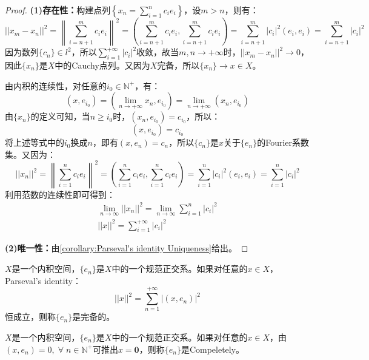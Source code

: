 \begin{proof}
	\textbf{(1)存在性：}构建点列$\left\{x_n=\sum\limits_{i=1}^{n}c_ie_i\right\}$，设$m>n$，则有：
	\begin{equation*}
		||x_m-x_n||^2=\left\|\sum_{i=n+1}^{m}c_ie_i\right\|^2=\left(\sum_{i=n+1}^{m}c_ie_i,\sum_{i=n+1}^{m}c_ie_i\right)=\sum_{i=n+1}^{m}|c_i|^2(e_i,e_i)=\sum_{i=n+1}^{m}|c_i|^2
	\end{equation*}
	因为数列$\{c_n\}\in l^2$，所以$\sum\limits_{i=1}^{+\infty}|c_i|^2$收敛，故当$m,n\to+\infty$时，$||x_m-x_n||^2\to0$，因此$\{x_n\}$是$X$中的Cauchy点列。又因为$X$完备，所以$\{x_n\}\to x\in X$。\par
	由内积的连续性，对任意的$i_0\in\mathbb{N}^+$，有：
	\begin{equation*}
		(x,e_{i_0})=\left(\lim_{n\to+\infty}x_n,e_{i_0}\right)=\lim_{n\to+\infty}(x_n,e_{i_0})
	\end{equation*}
	由$\{x_n\}$的定义可知，当$n\geqslant i_0$时，$(x_n,e_{i_0})=c_{i_0}$，所以：
	\begin{equation*}
		(x,e_{i_0})=c_{i_0}
	\end{equation*}
	将上述等式中的$i_0$换成$n$，即有$(x,e_n)=c_n$，所以$\{c_n\}$是$x$关于$\{e_n\}$的Fourier系数集。又因为：
	\begin{equation*}
		||x_n||^2=\left\|\sum_{i=1}^{n}c_ie_i\right\|^2=\left(\sum_{i=1}^{n}c_ie_i,\sum_{i=1}^{n}c_ie_i\right)=\sum_{i=1}^{n}|c_i|^2(e_i,e_i)=\sum_{i=1}^{n}|c_i|^2
	\end{equation*}
	利用范数的连续性即可得到：
	\begin{gather*}
		\lim_{n\to\infty}||x_n||^2=\lim_{n\to\infty}\sum_{i=1}^{n}|c_i|^2 \\
		||x||^2=\sum_{i=1}^{+\infty}|c_i|^2
	\end{gather*}\par
	\textbf{(2)唯一性：}由\cref{corollary:Parseval's identity Uniqueness}给出。
\end{proof}
\begin{definition}
	$X$是一个内积空间，$\{e_n\}$是$X$中的一个规范正交系。如果对任意的$x\in X$，Parseval's identity：
	\begin{equation*}
		||x||^2=\sum_{n=1}^{+\infty}|(x,e_n)|^2
	\end{equation*}
	恒成立，则称$\{e_n\}$是完备的。
\end{definition}
\begin{definition}
	$X$是一个内积空间，$\{e_n\}$是$X$中的一个规范正交系。如果对任意的$x\in X$，由$(x,e_n)=0,\;\forall\;n\in\mathbb{N}^+$可推出$x=\mathbf{0}$，则称$\{e_n\}$是\gls{Compeletely}。
\end{definition}
